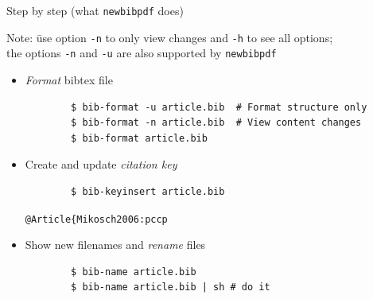 \documentclass[xcolor={table,dvipsnames}]{beamer}
\renewcommand{\emph}[1]{\textit{\color{orange!90!brown}#1}}
\newcommand{\faint}{\color{black!10!gray}}
\begin{document}
\begin{frame}[fragile]{Step by step (what \texttt{newbibpdf} does)}
  \begin{tabbing}
    Note: \=use option {\faint\verb!-n!} to only view changes
                   and {\faint\verb!-h!} to see all options; \\
	  \>the options {\faint\verb!-n!} and {\faint\verb!-u!}
	  are also supported by \texttt{newbibpdf}
  \end{tabbing}

  \begin{itemize}

    \item \emph{Format} bibtex file
      \begin{lstlisting}
        $ bib-format -u article.bib  # Format structure only
        $ bib-format -n article.bib  # View content changes
        $ bib-format article.bib
      \end{lstlisting}

    \item Create and update \emph{citation key}
      \begin{lstlisting}
        $ bib-keyinsert article.bib
      \end{lstlisting}
      \vspace{-0.5\baselineskip}
      \hfill{\faint\verb!@Article{Mikosch2006:pccp!}

    \item Show new filenames and \emph{rename} files
      \begin{lstlisting}
        $ bib-name article.bib
        $ bib-name article.bib | sh # do it
      \end{lstlisting}

  \end{itemize}
\end{frame}
\end{document}
